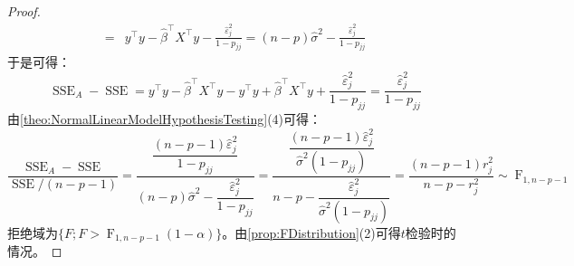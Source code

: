 \begin{proof}
\begin{align*}
		=&y^{\top}y-\hat{\beta}^{\top}X^{\top}y-\frac{\hat{\varepsilon}_j^2}{1-p_{jj}}=(n-p)\hat{\sigma}^2-\frac{\hat{\varepsilon}_j^2}{1-p_{jj}}
	\end{align*}
	于是可得：
	\begin{equation*}
		\operatorname{SSE}_A-\operatorname{SSE}=y^{\top}y-\hat{\beta}^{\top}X^{\top}y-y^{\top}y+\hat{\beta}^{\top}X^{\top}y+\frac{\hat{\varepsilon}_j^2}{1-p_{jj}}=\frac{\hat{\varepsilon}_j^2}{1-p_{jj}}
	\end{equation*}
	由\cref{theo:NormalLinearModelHypothesisTesting}(4)可得：
	\begin{equation*}
		\frac{\operatorname{SSE}_A-\operatorname{SSE}}{\operatorname{SSE}/(n-p-1)}=\dfrac{\dfrac{(n-p-1)\hat{\varepsilon}_j^2}{1-p_{jj}}}{(n-p)\hat{\sigma}^2-\dfrac{\hat{\varepsilon}_j^2}{1-p_{jj}}}=\dfrac{\dfrac{(n-p-1)\hat{\varepsilon}_j^2}{\hat{\sigma}^2(1-p_{jj})}}{n-p-\dfrac{\hat{\varepsilon}_j^2}{\hat{\sigma}^2(1-p_{jj})}}=\frac{(n-p-1)r_j^2}{n-p-r_j^2}\sim\operatorname{F}_{1,n-p-1}
	\end{equation*}
	拒绝域为$\{F;F>\operatorname{F}_{1,n-p-1}(1-\alpha)\}$。由\cref{prop:FDistribution}(2)可得$t$检验时的情况。
\end{proof}

